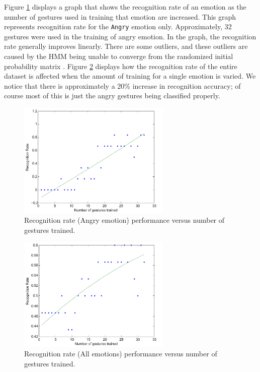 \documentclass[]{report}   %
\begin{document}
Figure \ref{fig:rr} displays a graph that shows the recognition rate of an emotion as the number of gestures used in training that emotion are increased. This graph represents recognition rate for the \texttt{Angry} emotion only. Approximately, 32 gestures were used in the training of angry emotion. In the graph, the recognition rate generally improves linearly. There are some outliers, and these outliers are caused by the HMM being unable to converge from the randomized initial probability matrix \cite{5384990}. Figure \ref{fig:rr2} displays how the recognition rate of the entire dataset is affected when the amount of training for a single emotion is varied. We notice that there is approximately a 20\% increase in recognition accuracy; of course most of this is just the angry gestures being classified properly.
\begin{figure}[htbp]
	\centering
		\includegraphics[width=0.65\textwidth]{rr.pdf}
	\caption{Recognition rate (Angry emotion) performance versus number of gestures trained.}
	\label{fig:rr}
\end{figure}

\begin{figure}[htbp]
	\centering
		\includegraphics[width=0.65\textwidth]{rr2.pdf}
	\caption{Recognition rate (All emotions) performance versus number of gestures trained.}
	\label{fig:rr2}
\end{figure}
\end{document}
